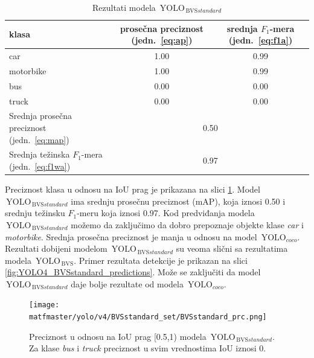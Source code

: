 \documentclass[12pt,oneside]{memoir}
\newcommand{\yolo}{\ensuremath{\,\textrm{YOLO}}}
\newcommand{\bvs}{\ensuremath{\,\textrm{BVS}}}
\begin{document}
\begin{table}
    \begin{center}
    \caption{Rezultati modela $\yolo_{\bvs{standard}}$}
        \begin{tabular}{|m{10em}|c|c|}
        \toprule
        klasa     & prosečna preciznost (jedn.~\ref{eq:ap}) & srednja $F_1$-mera (jedn.~\ref{eq:f1a})  \\ \hline
        \midrule
        car       & 1.00   & 0.99 \\ \hline
        motorbike & 1.00   & 0.99 \\ \hline
        bus       & 0.00   & 0.00 \\ \hline
        truck     & 0.00   & 0.00 \\ \hline
        \bottomrule
        Srednja prosečna preciznost (jedn.~\ref{eq:map}) & \multicolumn{2}{c|}{0.50}  \\ \hline
        Srednja težinska $F_1$-mera (jedn.~\ref{eq:f1wa}) & \multicolumn{2}{c|}{0.97}  \\ \hline
    \end{tabular}
    \label{tab:YOLO4_BVSstandard_results}
    \end{center}
\end{table}

Preciznost klasa u odnosu na IoU prag je prikazana na slici \ref{fig:YOLO4_BVSstandard_prc}. Model $\yolo_{\bvs{standard}}$ ima srednju prosečnu preciznost (mAP), koja iznosi 0.50 i srednju težinsku $F_1$-meru koja iznosi 0.97. Kod predviđanja modela  $\yolo_{\bvs{standard}}$ možemo da zaključimo da dobro prepoznaje objekte klase \textit{car} i \textit{motorbike}. Srednja prosečna preciznost je manja u odnosu na model $\yolo_{coco}$. Rezultati dobijeni modelom $\yolo_{\bvs{standard}}$ su veoma slični sa rezultatima modela $\yolo_{\bvs}$. Primer rezultata detekcije je prikazan na slici \ref{fig:YOLO4_BVSstandard_predictions}. Može se zaključiti da model $\yolo_{\bvs{standard}}$ daje bolje rezultate od modela $\yolo_{coco}$.


\begin{figure}[!ht]
    \centering
    \texttt{[image: matfmaster/yolo/v4/BVSstandard\_set/BVSstandard\_prc.png]}
    \caption{Preciznost u odnosu na IoU prag [0.5,1) modela $\yolo_{\bvs{standard}}$. Za klase \textit{bus} i \textit{truck} preciznost u svim vrednostima IoU iznosi 0.}
    \label{fig:YOLO4_BVSstandard_prc}
\end{figure}
\end{document}
